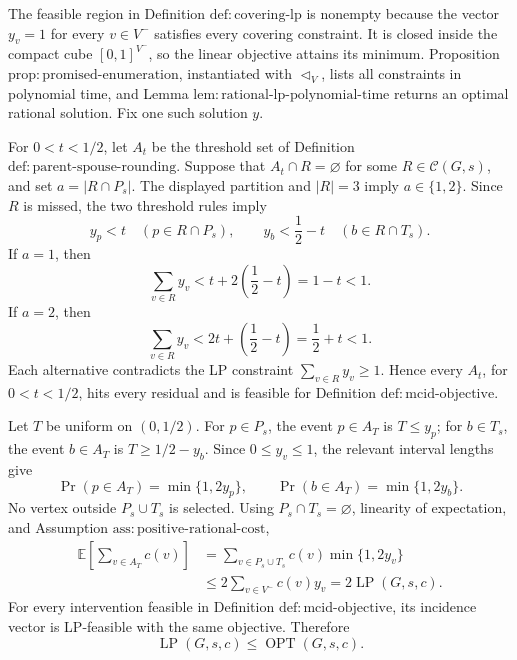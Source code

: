 The feasible region in Definition \(\mathrm{def{:}covering\mbox{-}lp}\) is nonempty because the vector \(y_v=1\) for every \(v\in V^{-}\) satisfies every covering constraint.  It is closed inside the compact cube \([0,1]^{V^{-}}\), so the linear objective attains its minimum.  Proposition \(\mathrm{prop{:}promised\mbox{-}enumeration}\), instantiated with \(\triangleleft_V\), lists all constraints in polynomial time, and Lemma \(\mathrm{lem{:}rational\mbox{-}lp\mbox{-}polynomial\mbox{-}time}\) returns an optimal rational solution.  Fix one such solution \(y\).

For \(0<t<1/2\), let \(A_t\) be the threshold set of Definition \(\mathrm{def{:}parent\mbox{-}spouse\mbox{-}rounding}\).  Suppose that \(A_t\cap R=\varnothing\) for some \(R\in\mathcal C(G,s)\), and set \(a=|R\cap P_s|\).  The displayed partition and \(|R|=3\) imply \(a\in\{1,2\}\).  Since \(R\) is missed, the two threshold rules imply
\[
 y_p<t\quad(p\in R\cap P_s),
 \qquad
 y_b<\frac12-t\quad(b\in R\cap T_s).
\]
If \(a=1\), then
\[
 \sum_{v\in R}y_v
 <t+2\left(\frac12-t\right)
 =1-t<1.
\]
If \(a=2\), then
\[
 \sum_{v\in R}y_v
 <2t+\left(\frac12-t\right)
 =\frac12+t<1.
\]
Each alternative contradicts the LP constraint \(\sum_{v\in R}y_v\geq1\).  Hence every \(A_t\), for \(0<t<1/2\), hits every residual and is feasible for Definition \(\mathrm{def{:}mcid\mbox{-}objective}\).

Let \(T\) be uniform on \((0,1/2)\).  For \(p\in P_s\), the event \(p\in A_T\) is \(T\leq y_p\); for \(b\in T_s\), the event \(b\in A_T\) is \(T\geq1/2-y_b\).  Since \(0\leq y_v\leq1\), the relevant interval lengths give
\[
 \Pr(p\in A_T)=\min\{1,2y_p\},
 \qquad
 \Pr(b\in A_T)=\min\{1,2y_b\}.
\]
No vertex outside \(P_s\cup T_s\) is selected.  Using \(P_s\cap T_s=\varnothing\), linearity of expectation, and Assumption \(\mathrm{ass{:}positive\mbox{-}rational\mbox{-}cost}\),
\[
 \begin{aligned}
 \mathbb E\!\left[\sum_{v\in A_T}c(v)\right]
 &=\sum_{v\in P_s\cup T_s}c(v)\min\{1,2y_v\}\\
 &\leq2\sum_{v\in V^{-}}c(v)y_v
 =2\operatorname{LP}(G,s,c).
 \end{aligned}
\]
For every intervention feasible in Definition \(\mathrm{def{:}mcid\mbox{-}objective}\), its incidence vector is LP-feasible with the same objective.  Therefore
\[
 \operatorname{LP}(G,s,c)\leq\operatorname{OPT}(G,s,c).
\]

